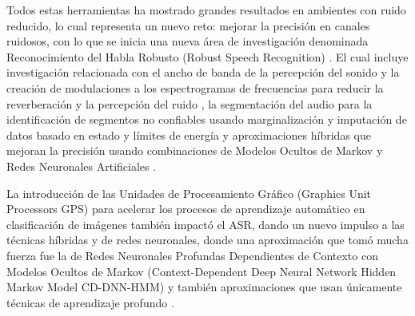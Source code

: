Todos estas herramientas ha mostrado grandes resultados en ambientes con ruido reducido, lo cual representa un nuevo reto: mejorar la precisión en canales ruidosos, con lo que se inicia una nueva área de investigación denominada Reconocimiento del Habla Robusto (Robust Speech Recognition) \cite{SieglerOnSystems,MirghaforiTowardsASR}. El cual incluye investigación relacionada con el ancho de banda de la percepción del sonido y la creación de modulaciones a los espectrogramas de frecuencias para reducir la reverberación y la percepción del ruido \cite{Kingsbury1998RobustSpectrogram}, la segmentación del audio para la identificación de segmentos no confiables usando marginalización y imputación de datos basado en estado y límites de energía \cite{Cooke2001RobustData} y aproximaciones híbridas  que mejoran la precisión usando combinaciones de Modelos Ocultos de Markov y Redes Neuronales Artificiales \cite{BourlardABands}.

La introducción de las Unidades de Procesamiento Gráfico (Graphics Unit Processors GPS) para acelerar los procesos de aprendizaje automático en clasificación de imágenes \cite{KrizhevskyImageNetNetworks} también impactó el ASR, dando un nuevo impulso a las técnicas híbridas y de redes neuronales, donde una aproximación que tomó mucha fuerza fue la de Redes Neuronales Profundas Dependientes de Contexto con Modelos Ocultos de Markov (Context-Dependent Deep Neural Network Hidden Markov Model CD-DNN-HMM) \cite{Yu_2014_1,Xiong2017}  y también aproximaciones que usan únicamente técnicas de aprendizaje profundo \cite{Povey_ASRU2011,1401.6984}.

